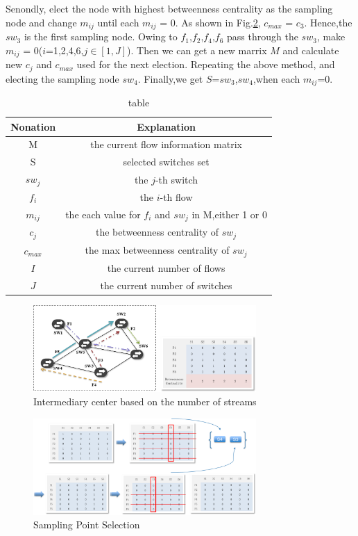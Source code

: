 \documentclass[conference,compsoc]{IEEEtran}
\begin{document}
Senondly, elect the node with highest betweenness centrality as the sampling node and change $m_{ij}$ until each $m_{ij}$ = 0. As shown in Fig.\ref{png_sampling_point_in.png}, $c_{max}$ = $c_3$. Hence,the $sw_3$ is the first sampling node. Owing to $f_1$,$f_2$,$f_4$,$f_6$ pass through the $sw_3$, make $m_{ij}$ = 0($i$=1,2,4,6,$j \in [1,J]$). Then we can get a new marrix $M$ and calculate new $c_j$ and $c_{max}$ used for the next election. Repeating the above method, and electing the sampling node $sw_4$. Finally,we get $S$={$sw_3$,$sw_4$},when each $m_{ij}$=0.  

\begin{table}[h]
\centering
\caption{table}\label{tab:tab2}
\begin{tabular}{c|c}
\hline
Nonation & Explanation\\
\hline
\hline
M & the current flow information matrix \\
\hline
S & selected switches set \\
\hline
$sw_j$ & the $j$-th switch \\
\hline
$f_i$ & the $i$-th flow \\
\hline
$m_{ij}$ & the each value for $f_i$ and $sw_j$ in M,either 1 or 0 \\
\hline
$c_j$ & the betweenness centrality of $sw_j$  \\
\hline
$c_{max}$ & the max betweenness centrality of $sw_j$  \\
\hline
$I$ & the current number of flows  \\
\hline
$J$ & the current number of switches  \\
\hline
\hline
\end{tabular}
\end{table}

\begin{figure}[!hhhhhhhhhht]
\centering
\includegraphics[width=8.5cm]{images/png_sampling_point.png}
\caption{Intermediary center based on the number of streams}
\label{png_sampling_point.png}
\end{figure}

\begin{figure}[!hhhhhhhhhht]
\centering
\includegraphics[width=8.5cm]{images/png_sampling_point_in.png}
\caption{Sampling Point Selection}
\label{png_sampling_point_in.png}
\end{figure}
\end{document}
